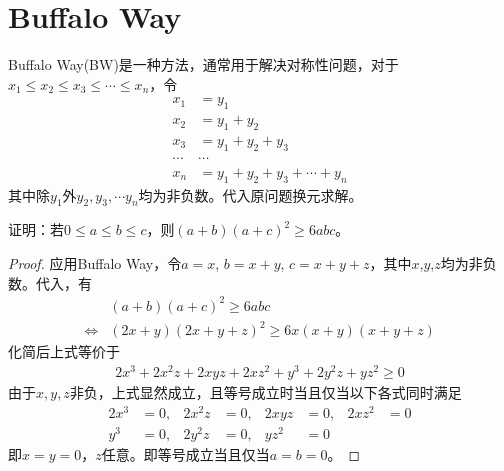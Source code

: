 
\chapter{Buffalo Way}
\label{chap:buffalo-way}

Buffalo Way(BW)是一种方法，通常用于解决对称性问题，对于$x_1\le x_2\le x_3\le \cdots\le x_n$，令
\begin{align*}
  x_1&=y_1\\
  x_2&=y_1+y_2\\
  x_3&=y_1+y_2+y_3\\
  \cdots&\cdots\\
  x_n&=y_1+y_2+y_3+\cdots+y_n
\end{align*}
其中除$y_1$外$y_2,y_3,\cdots y_n$均为非负数。代入原问题换元求解。

\begin{example}
  证明：若$0\le a\le b\le c$，则$(a+b)(a+c)^2\ge 6abc$。
\end{example}
\begin{proof}
  应用Buffalo Way，令$a=x$, $b=x+y$, $c=x+y+z$，其中$x$,$y$,$z$均为非负数。代入，有
  \begin{align*}
    &(a+b)(a+c)^2\ge 6abc\\
    \iff& (2x+y)(2x+y+z)^2\ge 6x(x+y)(x+y+z)
  \end{align*}
  化简后上式等价于
  \begin{align*}
    2x^3+2x^2z+2xyz+2xz^2+y^3+2y^2z+yz^2\ge 0
  \end{align*}
  由于$x,y,z$非负，上式显然成立，且等号成立时当且仅当以下各式同时满足
  \begin{align*}
    2x^3&=0,    &2x^2z&=0,  &2xyz&=0,  &2xz^2&=0\\
    y^3&=0,     &2y^2z&=0,  &yz^2&=0   &     &
  \end{align*}
  即$x=y=0$，$z$任意。即等号成立当且仅当$a=b=0$。
\end{proof}

